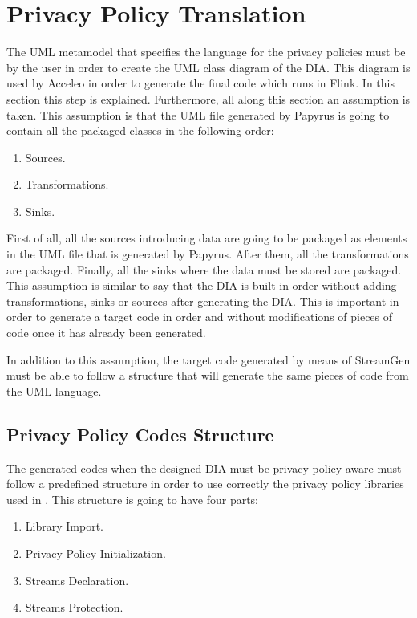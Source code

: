\section{Privacy Policy Translation}

The UML metamodel that specifies the language for the privacy policies must be by the user in order to create the UML class diagram of the DIA. This diagram is used by Acceleo in order to generate the final code which runs in Flink. In this section this step is explained. Furthermore, all along this section an assumption is taken. This assumption is that the UML file generated by Papyrus is going to contain all the packaged classes in the following order:

\begin{enumerate}
\item Sources.
\item Transformations.
\item Sinks.
\end{enumerate}

First of all, all the sources introducing data are going to be packaged as elements in the UML file that is generated by Papyrus. After them, all the transformations are packaged. Finally, all the sinks where the data must be stored are packaged. This assumption is similar to say that the DIA is built in order without adding transformations, sinks or sources after generating the DIA. This is important in order to generate a target code in order and without modifications of pieces of code once it has already been generated.

In addition to this assumption, the target code generated by means of StreamGen must be able to follow a structure that will generate the same pieces of code from the UML language.

\subsection{Privacy Policy Codes Structure}

The generated codes when the designed DIA must be privacy policy aware must follow a predefined structure in order to use correctly the privacy policy libraries used in \cite{privacypoliciesarticle}. This structure is going to have four parts:

\begin{enumerate}
\item Library Import.
\item Privacy Policy Initialization.
\item Streams Declaration.
\item Streams Protection.
\end{enumerate}

